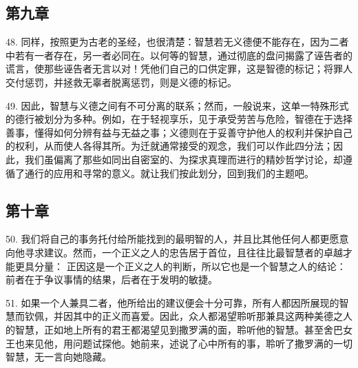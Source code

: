 
\subsection{第九章}

\par

48. 同样，按照更为古老的圣经，也很清楚：智慧若无义德便不能存在，因为二者中若有一者存在，另一者必同在。以何等的智慧，通过彻底的盘问揭露了诬告者的谎言，使那些诬告者无言以对！凭他们自己的口供定罪，这是智德的标记；将罪人交付惩罚，并拯救无辜者脱离惩罚，则是义德的标记。\par

49. 因此，智慧与义德之间有不可分离的联系；然而，一般说来，这单一特殊形式的德行被划分为多种。例如，在于轻视享乐，见于承受劳苦与危险，智德在于选择善事，懂得如何分辨有益与无益之事；义德则在于妥善守护他人的权利并保护自己的权利，从而使人各得其所。为迁就通常接受的观念，我们可以作此四分法；因此，我们虽偏离了那些如同出自密室的、为探求真理而进行的精妙哲学讨论，却遵循了通行的应用和寻常的意义。就让我们按此划分，回到我们的主题吧。\par


\subsection{第十章}

\par

50. 我们将自己的事务托付给所能找到的最明智的人，并且比其他任何人都更愿意向他寻求建议。然而，一个正义之人的忠告居于首位，且往往比最智慧者的卓越才能更具分量： 正因这是一个正义之人的判断，所以它也是一个智慧之人的结论：前者在于争议事情的结果，后者在于发明的敏捷。\par

51. 如果一个人兼具二者，他所给出的建议便会十分可靠，所有人都因所展现的智慧而钦佩，并因其中的正义而喜爱。因此，众人都渴望聆听那兼具这两种美德之人的智慧，正如地上所有的君王都渴望见到撒罗满的面，聆听他的智慧。甚至舍巴女王也来见他，用问题试探他。她前来，述说了心中所有的事，聆听了撒罗满的一切智慧，无一言向她隐藏。\par

